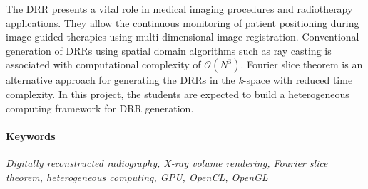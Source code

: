 %
%
%

\begin{abstract}
\lipsum[1]
\end{abstract}
The \ac{DRR} presents a vital role in medical imaging procedures and radiotherapy applications. They allow the continuous monitoring of patient positioning during image guided therapies using multi-dimensional image registration. Conventional generation of \acs{DRR}s using spatial domain algorithms such as ray casting is associated with computational complexity of $\mathcal{O}(N^3)$. Fourier slice theorem is an alternative approach for generating the \acs{DRR}s in the \emph{k}-space with reduced time complexity. In this project, the students are expected to build a heterogeneous computing framework for \acs{DRR} generation.

\paragraph*{Keywords}{\textit{Digitally reconstructed radiography, X-ray volume rendering, Fourier slice theorem, heterogeneous computing, \acs{GPU}, \acs{OpenCL}, \acs{OpenGL}}}

\newpage 